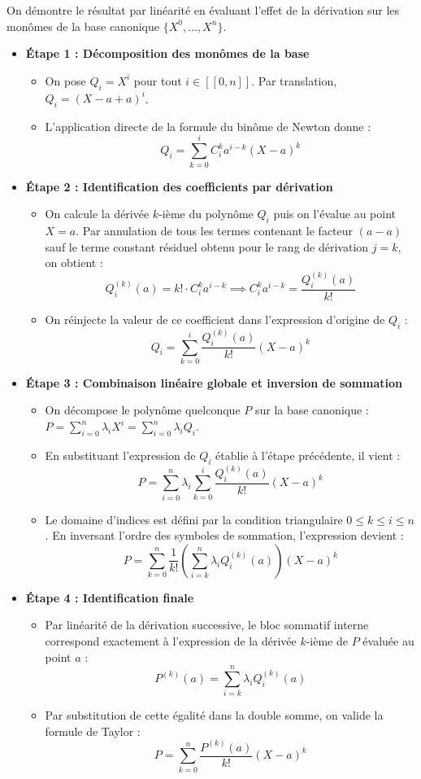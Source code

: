 \documentclass[11pt, a4paper]{article}
\theoremstyle{definition}
\begin{document}
On démontre le résultat par linéarité en évaluant l'effet de la dérivation sur les monômes de la base canonique $\{X^0, \dots, X^n\}$.
\begin{itemize}
  \item \textbf{Étape 1 : Décomposition des monômes de la base}
  \begin{itemize}
    \item On pose $Q_i = X^i$ pour tout $i \in [\![0,n]\!]$. Par translation, $Q_i = (X - a + a)^i$.
    \item L'application directe de la formule du binôme de Newton donne :
    $$Q_i = \sum_{k=0}^i C_i^k a^{i-k}(X-a)^k$$
  \end{itemize}
  \item \textbf{Étape 2 : Identification des coefficients par dérivation}
  \begin{itemize}
    \item On calcule la dérivée $k$-ième du polynôme $Q_i$ puis on l'évalue au point $X = a$. Par annulation de tous les termes contenant le facteur $(a-a)$ sauf le terme constant résiduel obtenu pour le rang de dérivation $j=k$, on obtient :
    $$Q_i^{(k)}(a) = k! \cdot C_i^k a^{i-k} \implies C_i^k a^{i-k} = \frac{Q_i^{(k)}(a)}{k!}$$
    \item On réinjecte la valeur de ce coefficient dans l'expression d'origine de $Q_i$ :
    $$Q_i = \sum_{k=0}^i \frac{Q_i^{(k)}(a)}{k!}(X-a)^k$$
  \end{itemize}
  \item \textbf{Étape 3 : Combinaison linéaire globale et inversion de sommation}
  \begin{itemize}
    \item On décompose le polynôme quelconque $P$ sur la base canonique : $P = \sum_{i=0}^n \lambda_i X^i = \sum_{i=0}^n \lambda_i Q_i$.
    \item En substituant l'expression de $Q_i$ établie à l'étape précédente, il vient :
    $$P = \sum_{i=0}^n \lambda_i \sum_{k=0}^i \frac{Q_i^{(k)}(a)}{k!}(X-a)^k$$
    \item Le domaine d'indices est défini par la condition triangulaire $0 \le k \le i \le n$. En inversant l'ordre des symboles de sommation, l'expression devient :
    $$P = \sum_{k=0}^n \frac{1}{k!} \left( \sum_{i=k}^n \lambda_i Q_i^{(k)}(a) \right) (X-a)^k$$
  \end{itemize}
  \item \textbf{Étape 4 : Identification finale}
  \begin{itemize}
    \item Par linéarité de la dérivation successive, le bloc sommatif interne correspond exactement à l'expression de la dérivée $k$-ième de $P$ évaluée au point $a$ :
    $$P^{(k)}(a) = \sum_{i=k}^n \lambda_i Q_i^{(k)}(a)$$
    \item Par substitution de cette égalité dans la double somme, on valide la formule de Taylor :
    $$P = \sum_{k=0}^n \frac{P^{(k)}(a)}{k!}(X-a)^k$$
  \end{itemize}
\end{itemize}
\end{document}
